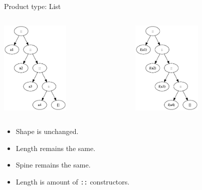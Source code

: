 \documentclass[presentation,aspectratio=169,smaller]{beamer}
\begin{document}
\begin{frame}[label={sec:org6eb5db7},fragile]{Product type: List}
 \begin{columns}
\begin{column}[t]{0.5\columnwidth}
\begin{center}
\includegraphics[height=4.5cm]{.dot/functor-list-1.png}
\end{center}
\end{column}

\begin{column}[t]{0.5\columnwidth}
\begin{center}
\includegraphics[height=4.5cm]{.dot/functor-list-2.png}
\end{center}
\end{column}
\end{columns}

\begin{itemize}
\item Shape is unchanged.
\item Length remains the same.
\item Spine remains the same.
\item Length is amount of \texttt{::} constructors.
\end{itemize}
\end{frame}
\end{document}
